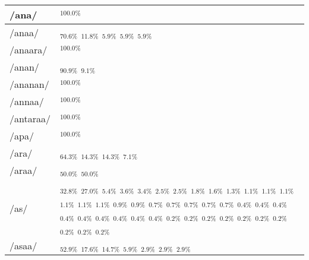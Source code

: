 \documentclass{article}
\begin{document}
\begin{longtable}{|l|p{}|}
/ana/ & \textIndus{}$_{100.0\%}$ \\ \hline
/anaa/ & \textIndus{}$_{70.6\%}$ \quad \textIndus{}$_{11.8\%}$ \quad \textIndus{}$_{5.9\%}$ \quad \textIndus{}$_{5.9\%}$ \quad \textIndus{}$_{5.9\%}$ \\ \hline
/anaara/ & \textIndus{}$_{100.0\%}$ \\ \hline
/anan/ & \textIndus{}$_{90.9\%}$ \quad \textIndus{}$_{9.1\%}$ \\ \hline
/ananan/ & \textIndus{}$_{100.0\%}$ \\ \hline
/annaa/ & \textIndus{}$_{100.0\%}$ \\ \hline
/antaraa/ & \textIndus{}$_{100.0\%}$ \\ \hline
/apa/ & \textIndus{}$_{100.0\%}$ \\ \hline
/ara/ & \textIndus{}$_{64.3\%}$ \quad \textIndus{}$_{14.3\%}$ \quad \textIndus{}$_{14.3\%}$ \quad \textIndus{}$_{7.1\%}$ \\ \hline
/araa/ & \textIndus{}$_{50.0\%}$ \quad \textIndus{}$_{50.0\%}$ \\ \hline
/as/ & \textIndus{}$_{32.8\%}$ \quad \textIndus{}$_{27.0\%}$ \quad \textIndus{}$_{5.4\%}$ \quad \textIndus{}$_{3.6\%}$ \quad \textIndus{}$_{3.4\%}$ \quad \textIndus{}$_{2.5\%}$ \quad \textIndus{}$_{2.5\%}$ \quad \textIndus{}$_{1.8\%}$ \quad \textIndus{}$_{1.6\%}$ \quad \textIndus{}$_{1.3\%}$ \quad \textIndus{}$_{1.1\%}$ \quad \textIndus{}$_{1.1\%}$ \quad \textIndus{}$_{1.1\%}$ \quad \textIndus{}$_{1.1\%}$ \quad \textIndus{}$_{1.1\%}$ \quad \textIndus{}$_{1.1\%}$ \quad \textIndus{}$_{0.9\%}$ \quad \textIndus{}$_{0.9\%}$ \quad \textIndus{}$_{0.7\%}$ \quad \textIndus{}$_{0.7\%}$ \quad \textIndus{}$_{0.7\%}$ \quad \textIndus{}$_{0.7\%}$ \quad \textIndus{}$_{0.7\%}$ \quad \textIndus{}$_{0.4\%}$ \quad \textIndus{}$_{0.4\%}$ \quad \textIndus{}$_{0.4\%}$ \quad \textIndus{}$_{0.4\%}$ \quad \textIndus{}$_{0.4\%}$ \quad \textIndus{}$_{0.4\%}$ \quad \textIndus{}$_{0.4\%}$ \quad \textIndus{}$_{0.4\%}$ \quad \textIndus{}$_{0.4\%}$ \quad \textIndus{}$_{0.2\%}$ \quad \textIndus{}$_{0.2\%}$ \quad \textIndus{}$_{0.2\%}$ \quad \textIndus{}$_{0.2\%}$ \quad \textIndus{}$_{0.2\%}$ \quad \textIndus{}$_{0.2\%}$ \quad \textIndus{}$_{0.2\%}$ \quad \textIndus{}$_{0.2\%}$ \quad \textIndus{}$_{0.2\%}$ \quad \textIndus{}$_{0.2\%}$ \\ \hline
/asaa/ & \textIndus{}$_{52.9\%}$ \quad \textIndus{}$_{17.6\%}$ \quad \textIndus{}$_{14.7\%}$ \quad \textIndus{}$_{5.9\%}$ \quad \textIndus{}$_{2.9\%}$ \quad \textIndus{}$_{2.9\%}$ \quad \textIndus{}$_{2.9\%}$ \\ \hline

\end{longtable}
\end{document}
